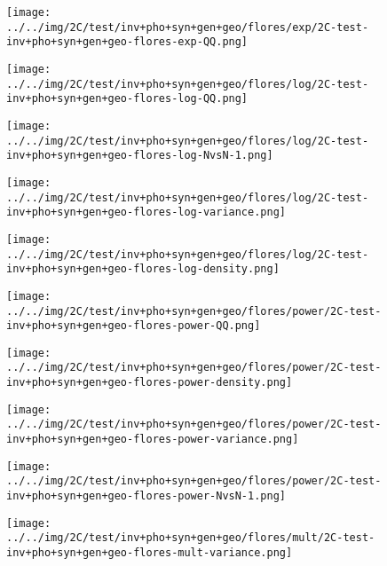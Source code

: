 \begin{figure}[H]
\centering	\texttt{[image: ../../img/2C/test/inv+pho+syn+gen+geo/flores/exp/2C-test-inv+pho+syn+gen+geo-flores-exp-QQ.png]}
\end{figure}
\begin{figure}[H]
\centering	\texttt{[image: ../../img/2C/test/inv+pho+syn+gen+geo/flores/log/2C-test-inv+pho+syn+gen+geo-flores-log-QQ.png]}
\end{figure}
\begin{figure}[H]
\centering	\texttt{[image: ../../img/2C/test/inv+pho+syn+gen+geo/flores/log/2C-test-inv+pho+syn+gen+geo-flores-log-NvsN-1.png]}
\end{figure}
\begin{figure}[H]
\centering	\texttt{[image: ../../img/2C/test/inv+pho+syn+gen+geo/flores/log/2C-test-inv+pho+syn+gen+geo-flores-log-variance.png]}
\end{figure}
\begin{figure}[H]
\centering	\texttt{[image: ../../img/2C/test/inv+pho+syn+gen+geo/flores/log/2C-test-inv+pho+syn+gen+geo-flores-log-density.png]}
\end{figure}
\begin{figure}[H]
\centering	\texttt{[image: ../../img/2C/test/inv+pho+syn+gen+geo/flores/power/2C-test-inv+pho+syn+gen+geo-flores-power-QQ.png]}
\end{figure}
\begin{figure}[H]
\centering	\texttt{[image: ../../img/2C/test/inv+pho+syn+gen+geo/flores/power/2C-test-inv+pho+syn+gen+geo-flores-power-density.png]}
\end{figure}
\begin{figure}[H]
\centering	\texttt{[image: ../../img/2C/test/inv+pho+syn+gen+geo/flores/power/2C-test-inv+pho+syn+gen+geo-flores-power-variance.png]}
\end{figure}
\begin{figure}[H]
\centering	\texttt{[image: ../../img/2C/test/inv+pho+syn+gen+geo/flores/power/2C-test-inv+pho+syn+gen+geo-flores-power-NvsN-1.png]}
\end{figure}
\begin{figure}[H]
\centering	\texttt{[image: ../../img/2C/test/inv+pho+syn+gen+geo/flores/mult/2C-test-inv+pho+syn+gen+geo-flores-mult-variance.png]}
\end{figure}
